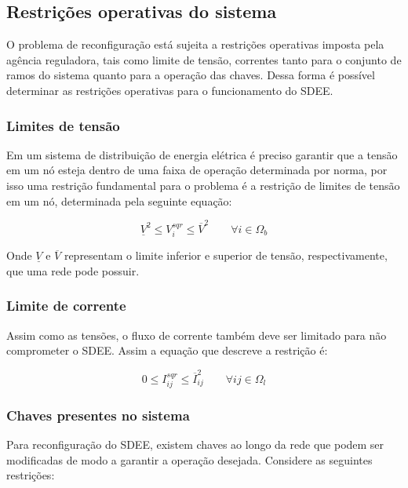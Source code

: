 \subsection{Restrições operativas do sistema}

O problema de reconfiguração está sujeita a restrições operativas imposta pela agência reguladora, tais como limite de tensão, correntes tanto para o conjunto de ramos do sistema quanto para a operação das chaves.
Dessa forma é possível determinar as restrições operativas para o funcionamento do SDEE.

\subsubsection{Limites de tensão}

Em um sistema de distribuição de energia elétrica é preciso garantir que a tensão em um nó esteja dentro de uma faixa de operação determinada por norma, por isso uma restrição fundamental para o problema é a restrição de limites de tensão em um nó, determinada pela seguinte equação:

\begin{equation}
    \underline{V}^{2} \leq V_{i}^{sqr} \leq \overline{V}^{2}\qquad\forall i \in\Omega_{b}
\end{equation}

Onde $\underline{V}$ e $\overline{V}$ representam o limite inferior e superior de tensão, respectivamente, que uma rede pode possuir.


\subsubsection{Limite de corrente}

Assim como as tensões, o fluxo de corrente também deve ser limitado para não comprometer o SDEE.
Assim a equação que descreve a restrição é:

\begin{equation}
    0 \leq I_{ij}^{sqr} \leq \overline{I}_{ij}^{2} \qquad\forall ij\in\Omega_{l} 
\end{equation}

\subsubsection{Chaves presentes no sistema}

Para reconfiguração do SDEE, existem chaves ao longo da rede que podem ser modificadas de modo a garantir a operação desejada.
Considere as seguintes restrições:

